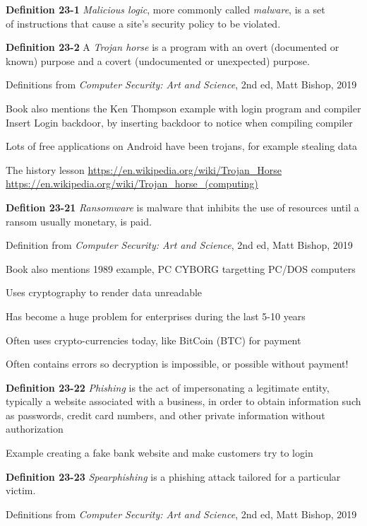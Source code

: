 \documentclass[Screen16to9,17pt]{foils}
\begin{document}
\begin{list1}
\item {\bf Definition 23-1} \emph{Malicious logic}, more commonly called \emph{malware}, is a set\\
 of instructions that cause a site's security policy to be violated.
\item {\bf Definition 23-2} A \emph{Trojan horse} is a program with an overt (documented or\\
known) purpose and a covert (undocumented or unexpected) purpose.
\item Definitions from \emph{Computer Security: Art and Science}, 2nd ed, Matt Bishop, 2019
\item Book also mentions the Ken Thompson example with login program and compiler\\Insert Login backdoor, by inserting backdoor to notice when compiling compiler \smiley
\item Lots of free applications on Android have been trojans, for example stealing data
\end{list1}

The history lesson
\url{https://en.wikipedia.org/wiki/Trojan_Horse}\\
\url{https://en.wikipedia.org/wiki/Trojan_horse_(computing)}



\begin{list1}
\item {\bf Defition 23-21} \emph{Ransomware} is malware that inhibits the use of resources until a ransom usually monetary, is paid.
\item Definition from \emph{Computer Security: Art and Science}, 2nd ed, Matt Bishop, 2019
\item Book also mentions 1989 example, PC CYBORG targetting PC/DOS computers
\item Uses cryptography to render data unreadable
\item Has become a huge problem for enterprises during the last 5-10 years
\item Often uses crypto-currencies today, like BitCoin (BTC) for payment
\item Often contains errors so decryption is impossible, or possible without payment!

\end{list1}




\begin{list1}
\item {\bf Definition 23-22} \emph{Phishing} is the act of impersonating a legitimate entity, typically a website associated with a business, in order to obtain information such as passwords, credit card numbers, and other private information without authorization
\item Example creating a fake bank website and make customers try to login
\item {\bf Definition 23-23} \emph{Spearphishing} is a phishing attack tailored for a particular victim.
\item Definitions from \emph{Computer Security: Art and Science}, 2nd ed, Matt Bishop, 2019
\end{list1}
\end{document}
